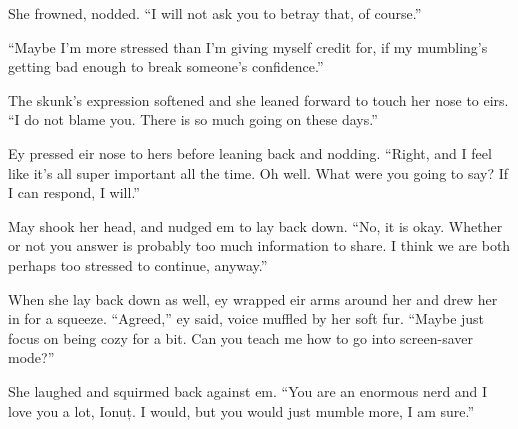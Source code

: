 She frowned, nodded. ``I will not ask you to betray that, of course.''

``Maybe I'm more stressed than I'm giving myself credit for, if my mumbling's getting bad enough to break someone's confidence.''

The skunk's expression softened and she leaned forward to touch her nose to eirs. ``I do not blame you. There is so much going on these days.''

Ey pressed eir nose to hers before leaning back and nodding. ``Right, and I feel like it's all super important all the time. Oh well. What were you going to say? If I can respond, I will.''

May shook her head, and nudged em to lay back down. ``No, it is okay. Whether or not you answer is probably too much information to share. I think we are both perhaps too stressed to continue, anyway.''

When she lay back down as well, ey wrapped eir arms around her and drew her in for a squeeze. ``Agreed,'' ey said, voice muffled by her soft fur. ``Maybe just focus on being cozy for a bit. Can you teach me how to go into screen-saver mode?''

She laughed and squirmed back against em. ``You are an enormous nerd and I love you a lot, Ionuț. I would, but you would just mumble more, I am sure.''

